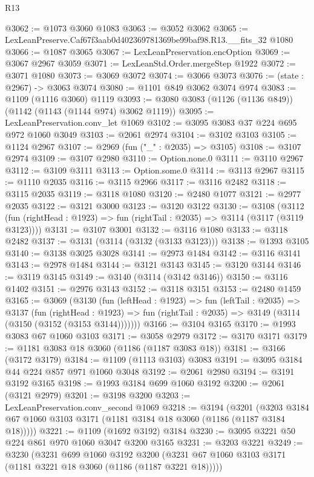 \begin{lexlean}{R13}
\begin{coremodule}
@3062 := @1073 @3060 @1083
@3063 := @3052 @3062
@3065 := LexLeanPreserve.Caf67f3aab0d402369781369be99baf98.R13.__fits_32 @1080
@3066 := @1087 @3065
@3067 := LexLeanPreservation.encOption
@3069 := @3067 @2967 @3059
@3071 := LexLeanStd.Order.mergeStep @1922
@3072 := @3071 @1080
@3073 := @3069 @3072
@3074 := @3066 @3073
@3076 := (state : @2967) -> @3063 @3074
@3080 := @1101 @849 @3062 @3074 @974
@3083 := @1109 (@1116 @3060) @1119
@3093 := @3080 @3083 (@1126 (@1136 @849)) (@1142 (@1143 (@1144 @974) @3062 @1119))
@3095 := LexLeanPreservation.conv_let @1069
@3102 := @3095 @3083 @37 @224 @695 @972 @1060 @3049
@3103 := @2061 @2974
@3104 := @3102 @3103
@3105 := @1124 @2967
@3107 := @2969 (fun ("_" : @2035) => @3105)
@3108 := @3107 @2974
@3109 := @3107 @2980
@3110 := Option.none.{0}
@3111 := @3110 @2967
@3112 := @3109 @3111
@3113 := Option.some.{0}
@3114 := @3113 @2967
@3115 := @1110 @2035
@3116 := @3115 @2966
@3117 := @3116 @2482
@3118 := @3115 @2035
@3119 := @3118 @1080
@3120 := @2480 @1077
@3121 := @2977 @2035
@3122 := @3121 @3000
@3123 := @3120 @3122
@3130 := @3108
    (@3112 (fun (rightHead : @1923) => fun (rightTail : @2035) => @3114 (@3117 (@3119 @3123))))
@3131 := @3107 @3001
@3132 := @3116 @1080
@3133 := @3118 @2482
@3137 := @3131 (@3114 (@3132 (@3133 @3123)))
@3138 := @1393 @3105
@3140 := @3138 @3025 @3028
@3141 := @2973 @1484
@3142 := @3116 @3141
@3143 := @2978 @1484
@3144 := @3121 @3143
@3145 := @3120 @3144
@3146 := @3119 @3145
@3149 := @3140 (@3114 (@3142 @3146))
@3150 := @3116 @1402
@3151 := @2976 @3143
@3152 := @3118 @3151
@3153 := @2480 @1459
@3165 := @3069
    (@3130
      (fun (leftHead : @1923) =>
      fun (leftTail : @2035) =>
      @3137
        (fun (rightHead : @1923) =>
        fun (rightTail : @2035) => @3149 (@3114 (@3150 (@3152 (@3153 @3144)))))))
@3166 := @3104 @3165
@3170 := @1993 @3083 @67 @1060 @3103
@3171 := @3058 @2979
@3172 := @3170 @3171
@3179 := @1181 @3083 @18 @3060 (@1186 (@1187 @3083 @18))
@3181 := @3166 (@3172 @3179)
@3184 := @1109 (@1113 @3103) @3083
@3191 := @3095 @3184 @44 @224 @857 @971 @1060 @3048
@3192 := @2061 @2980
@3194 := @3191 @3192 @3165
@3198 := @1993 @3184 @699 @1060 @3192
@3200 := @2061 (@3121 @2979)
@3201 := @3198 @3200
@3203 := LexLeanPreservation.conv_second @1069
@3218 := @3194
    (@3201 (@3203 @3184 @67 @1060 @3103 @3171 (@1181 @3184 @18 @3060 (@1186 (@1187 @3184 @18)))))
@3221 := @1109 (@1692 @3192) @3184
@3230 := @3095 @3221 @50 @224 @861 @970 @1060 @3047 @3200 @3165
@3231 := @3203 @3221
@3249 := @3230
    (@3231
      @699
      @1060
      @3192
      @3200
      (@3231 @67 @1060 @3103 @3171 (@1181 @3221 @18 @3060 (@1186 (@1187 @3221 @18)))))

\end{coremodule}
\end{lexlean}
